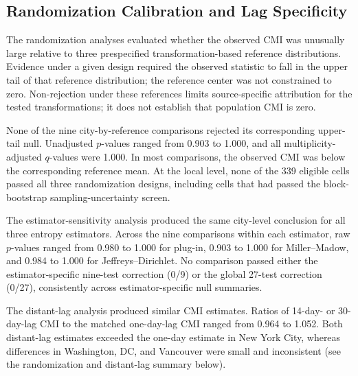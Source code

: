 \documentclass[applsci,article,accept,moreauthors]{Definitions/mdpi}
\def\hl#1{#1}%
\newcommand{\DistantRatioMin}{0.964}
\newcommand{\DistantRatioMax}{1.052}
\newcommand{\ESeventeenWithinRejects}{0}
\newcommand{\ESeventeenGlobalRejects}{0}
\begin{document}
\subsection{Randomization Calibration and Lag Specificity}
\label{subsec:results_nulls}

The randomization analyses evaluated whether the observed CMI was unusually
large relative to three prespecified transformation-based reference
distributions. Evidence under a given design required the observed
statistic to fall in the upper tail of that reference distribution;
the reference center was not constrained to zero.
{Non-rejection under these references limits source-specific attribution
for the tested transformations; it does not establish that population CMI is
zero.}

None of the nine city-by-reference comparisons rejected its corresponding
upper-tail null. Unadjusted \(p\)-values ranged from 0.903 to 1.000, and all
multiplicity-adjusted \(q\)-values were 1.000. In most comparisons, the observed CMI was below
the corresponding reference mean. At the local level, none of the 339
eligible cells passed all three randomization designs, including cells
that had passed the block-bootstrap sampling-uncertainty screen.

The estimator-sensitivity analysis produced the same city-level conclusion
for all three entropy estimators. Across the nine comparisons within each estimator, raw
\(p\)-values ranged from 0.980 to 1.000 for plug-in, 0.903 to 1.000 for
Miller--Madow, and 0.984 to 1.000 for Jeffreys--Dirichlet. No comparison
passed either the estimator-specific nine-test correction
({\ESeventeenWithinRejects{}/9}) or the global 27-test correction
(\ESeventeenGlobalRejects{}/27), consistently across estimator-specific null
summaries.

The distant-lag analysis produced similar CMI estimates. Ratios of
14-day- or \mbox{30-day-lag} CMI to the matched one-day-lag CMI ranged from
\DistantRatioMin{} to \DistantRatioMax{}. Both distant-lag estimates
exceeded the one-day estimate in New York City, whereas differences
in Washington, DC, and Vancouver were small and inconsistent
\hl{(see the randomization and distant-lag summary below).}%
\end{document}
